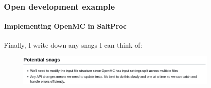 \begin{frame}[fragile]
    \frametitle{Open development example}
    \framesubtitle{Implementing OpenMC in SaltProc}

    Finally, I write down any snags I can think of:
    \vspace{0.5cm}
    \begin{figure}[htpb]
        \centering
        \includegraphics[width=10cm]{images/open-dev-ex3.png}
    \end{figure}

\end{frame}
